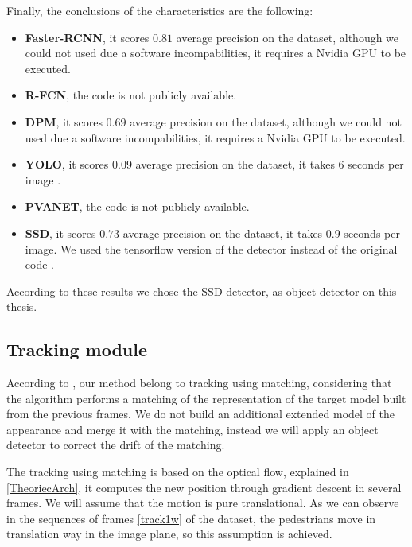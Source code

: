 Finally, the conclusions of the characteristics are the following:

\begin{itemize}

\item \textbf{Faster-RCNN}, it scores $0.81$ average precision on the dataset, although we could not used due a software incompabilities, it requires a Nvidia GPU to be executed.

\item \textbf{R-FCN}, the code is not publicly available.

\item \textbf{DPM}, it scores $0.69$ average precision on the dataset, although we could not used due a software incompabilities, it requires a Nvidia GPU to be executed.

\item \textbf{YOLO}, it scores $0.09$ average precision on the dataset, it takes $6$ seconds per image \cite{yoloDark}. 

\item \textbf{PVANET}, the code is not publicly available.

\item \textbf{SSD}, it scores $0.73$ average precision on the dataset, it takes $0.9$ seconds per image. We used the tensorflow version of the detector \cite{ssdCode} instead of the original code \cite{ssdCode2}.


\end{itemize}

According to these results we chose the SSD detector, as object detector on this thesis.

\subsection{Tracking module}

According to \cite{visualTrackingSurvey}, our method belong to tracking using matching, considering that the algorithm performs a matching of the representation of the target model built from the previous frames. We do not build an additional extended model of the appearance and merge it with the matching, instead we will apply an object detector to correct the drift of the matching.


The tracking using matching is based on the optical flow, explained in \ref{TheoriecArch}, it computes the new position through gradient descent in several frames. We will assume that the motion is pure translational. As we can observe in the sequences of frames \ref{track1w} of the dataset, the pedestrians move in translation way in the image plane, so this assumption is achieved. 


